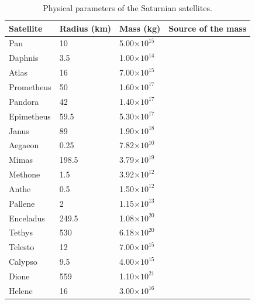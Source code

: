 \documentclass{aa}
\begin{document}
\begin{appendix}
    
\begin{table}[!ht]
\caption{Physical parameters of the Saturnian satellites.}
    \centering
    \small                
\setlength{\tabcolsep}{4pt} 
    \begin{tabular}{llll}
    
        Satellite & Radius (km) & Mass (kg) & Source of the mass \\ \hline
        Pan & 10 & 5.00$\times10^{15 }$ & \cite{Williams_NSSDCA_SaturnianFact} \\ 
        Daphnis & 3.5 & 1.00$\times10^{14 }$ & \cite{Williams_NSSDCA_SaturnianFact} \\ 
        Atlas & 16 & 7.00$\times10^{15 }$ & \cite{Williams_NSSDCA_SaturnianFact} \\ 
        Prometheus & 50 & 1.60$\times10^{17 }$ & \cite{Williams_NSSDCA_SaturnianFact} \\ 
        Pandora & 42 & 1.40$\times10^{17 }$ & \cite{Williams_NSSDCA_SaturnianFact} \\ 
        Epimetheus & 59.5 & 5.30$\times10^{17 }$ & \cite{Williams_NSSDCA_SaturnianFact} \\ 
        Janus & 89 & 1.90$\times10^{18 }$ & \cite{Williams_NSSDCA_SaturnianFact} \\ 
        Aegaeon & 0.25 & 7.82$\times10^{10 }$ & \cite{THOMAS2020} \\ 
        Mimas & 198.5 & 3.79$\times10^{19 }$ & \cite{Williams_NSSDCA_SaturnianFact} \\ 
        Methone & 1.5 & 3.92$\times10^{12 }$ & \cite{THOMAS2020} \\ 
        Anthe & 0.5 & 1.50$\times10^{12 }$ & \cite{Williams_NSSDCA_SaturnianFact} \\ 
        Pallene & 2 & 1.15$\times10^{13 }$ & \cite{THOMAS2020} \\ 
        Enceladus & 249.5 & 1.08$\times10^{20 }$ & \cite{Williams_NSSDCA_SaturnianFact} \\ 
        Tethys & 530 & 6.18$\times10^{20 }$ & \cite{Williams_NSSDCA_SaturnianFact} \\ 
        Telesto & 12 & 7.00$\times10^{15 }$ & \cite{Williams_NSSDCA_SaturnianFact} \\ 
        Calypso & 9.5 & 4.00$\times10^{15 }$ & \cite{Williams_NSSDCA_SaturnianFact} \\ 
        Dione & 559 & 1.10$\times10^{21 }$ & \cite{Williams_NSSDCA_SaturnianFact} \\ 
        Helene & 16 & 3.00$\times10^{16 }$ & \cite{Williams_NSSDCA_SaturnianFact} \\ 

\end{tabular}
\end{table}
\end{appendix}
\end{document}
